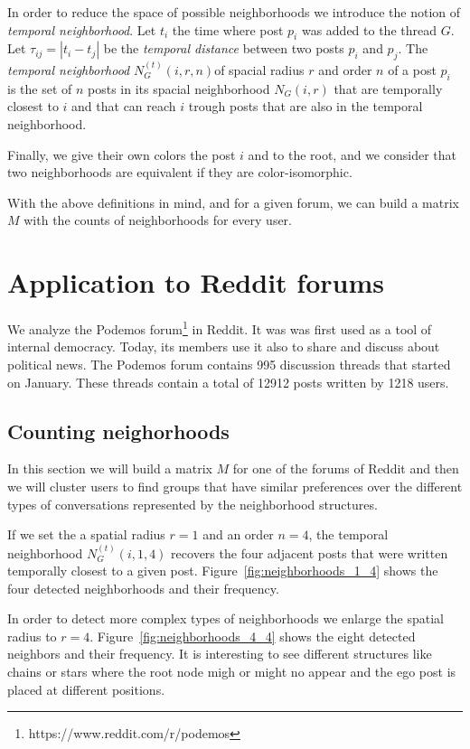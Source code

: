 \documentclass[smallextended]{svjour3}          %
\begin{document}
In order to reduce the space of possible neighborhoods we introduce the notion of \textit{temporal neighborhood}. Let $t_i$ the time where post $p_i$ was added to the thread $G$. Let $\tau_{ij}=|t_i-t_j|$ be the \textit{temporal distance} between two posts $p_i$ and $p_j$. The \textit{temporal neighborhood} $N_{G}^{(t)}(i, r, n)$of spacial radius $r$ and order $n$ of a post $p_i$ is the set of $n$ posts in its spacial neighborhood $N_{G}(i, r)$ that are temporally closest to $i$ and that can reach $i$ trough posts that are also in the temporal neighborhood.

Finally, we give their own colors the post $i$ and to the root, and we consider that two neighborhoods are equivalent if they are color-isomorphic.

With the above definitions in mind, and for a given forum, we can build a matrix $M$ with the counts of neighborhoods for every user. 

\section{Application to Reddit forums}

We analyze the Podemos forum\footnote{https://www.reddit.com/r/podemos} in Reddit. It was was first used as a tool of internal democracy. Today, its members use it also to share and discuss about political news.
The Podemos forum contains 995 discussion threads that started on January. These threads contain a total of 12912 posts written by 1218 users.

\subsection{Counting neighorhoods}
In this section we will build a matrix $M$ for one of the forums of Reddit and then we will cluster users to find groups that have similar preferences over the different types of conversations represented by the neighborhood structures. 

If we set the a spatial radius $r=1$ and an order $n=4$, the temporal neighborhood $N_{G}^{(t)}(i, 1, 4)$ recovers the four adjacent posts that were written temporally closest to a given post. Figure~\ref{fig:neighborhoods_1_4} shows the four detected neighborhoods and their frequency.

In order to detect more complex types of neighborhoods we enlarge the spatial radius to $r=4$. Figure~\ref{fig:neighborhoods_4_4} shows the eight detected neighbors and their frequency. It is interesting to see different structures like chains or stars where the root node migh or might no appear and the ego post is placed at different positions.
\end{document}
